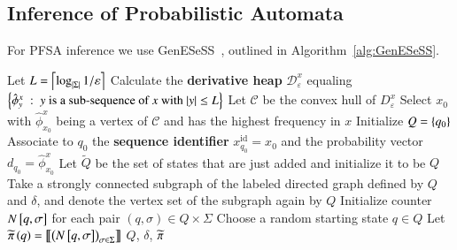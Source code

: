 \documentclass[9pt,journal]{IEEEtran}
\begin{document}
{   \subsection{Inference of Probabilistic Automata}
   For PFSA inference we use  \textsf{GenESeSS}~\cite{chattopadhyay2013abductive}, outlined in Algorithm~\ref{alg:GenESeSS}.
\begin{algorithm}[!ht]
  \small
  Let $L=\left\lceil{\log_{\left| \Sigma \right|}1/\varepsilon}\right\rceil$\; \label{algline:GenL}
  Calculate the \textbf{derivative heap} $\mathcal{D}^{x}_{\varepsilon}$ equaling $\set{\hat{\phi}^{x}_y\ :\ \textrm{$y$ is a sub-sequence of $x$ with } |y|\leq L}$\;
  Let $\mathcal{C}$ be the convex hull of $D^{x}_{\varepsilon}$\; \label{algline:GenConv}
  Select $x_0$ with $\hat{\phi}^{x}_{x_0}$ being a vertex of $\mathcal{C}$ and has the highest frequency in $x$\; \label{algline:GenSyncSeq}
  Initialize $Q = \left\{ q_0 \right\}$\; \label{algline:GenStep2Start}
  Associate to $q_0$ the \textbf{sequence identifier} $x^{\textrm{id}}_{q_0} = x_0$ and the probability vector $d_{q_0} = \hat{\phi}^x_{x_0}$\;
  Let $\widetilde{Q}$ be the set of states that are just added and initialize it to be $Q$\;
  Take a strongly connected subgraph of the labeled directed graph defined by $Q$ and $\delta$, and denote the vertex set of the subgraph again by $Q$\;\label{algline:GenStep2End}
  Initialize counter $N\left[ q,\sigma \right]$ for each pair $(q, \sigma) \in Q\times\Sigma$\; \label{algline:GenIdenTransProbStart}
  Choose a random starting state $q\in Q$\;
  Let $\widetilde{\pi}\left( q \right) = \left\llbracket{\left( N\left[ q,\sigma \right] \right)_{\sigma\in\Sigma}}\right\rrbracket$\;\label{algline:GenIdenTransProbEnd}
  \Return $Q$, $\delta$, $\widetilde{\pi}$\;
  \caption{\algo}
  \label{alg:GenESeSS}
\end{algorithm}
}
\end{document}
